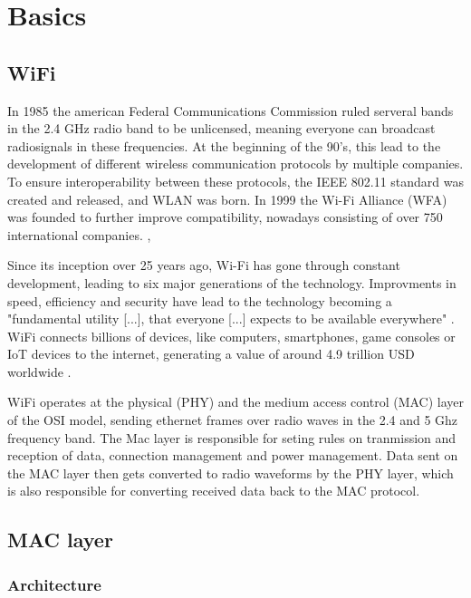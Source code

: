 \chapter{Basics}\label{ch:basics}

\section{WiFi}

In 1985 the american Federal Communications Commission ruled serveral bands in the 2.4 GHz radio band to be unlicensed, meaning everyone can broadcast radiosignals in these frequencies.
At the beginning of the 90's, this lead to the development of different wireless communication protocols by multiple companies.
To ensure interoperability between these protocols, the IEEE 802.11 standard was created and released, and WLAN was born.
In 1999 the Wi-Fi Alliance (WFA) was founded to further improve compatibility, nowadays consisting of over 750 international companies. \cite[page~1-3]{Sankaran_Gulasekaran_2021}, \cite{Wikipedia_2025}

Since its inception over 25 years ago, Wi-Fi has gone through constant development, leading to six major generations of the technology.
Improvments in speed, efficiency and security have lead to the technology becoming a "fundamental utility [...], that everyone [...] expects to be available everywhere" \cite[page~1]{Sankaran_Gulasekaran_2021}.
WiFi connects billions of devices, like computers, smartphones, game consoles or IoT devices to the internet, generating a value of around 4.9 trillion USD worldwide \cite[page~1]{Sankaran_Gulasekaran_2021}.

WiFi operates at the physical (PHY) and the medium access control (MAC) layer of the OSI model, sending ethernet frames over radio waves in the 2.4 and 5 Ghz frequency band. 
The Mac layer is responsible for seting rules on tranmission and reception of data, connection management and power management.
Data sent on the MAC layer then gets converted to radio waveforms by the PHY layer, which is also responsible for converting received data back to the MAC protocol. \cite[page~4-7]{Sankaran_Gulasekaran_2021}

\section{MAC layer}

\subsection{Architecture}

